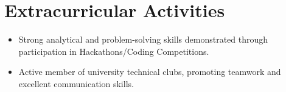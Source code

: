\documentclass[letterpaper,11pt]{article}
\newcommand{\resumeItem}[1]{
  \item\small{
    {#1 \vspace{-2pt}}
  }
}
\newcommand{\resumeSubItem}[1]{\resumeItem{#1}\vspace{-4pt}}
\newcommand{\resumeSubHeadingListStart}{\begin{itemize}[leftmargin=0.15in, label={}]}
\newcommand{\resumeSubHeadingListEnd}{\end{itemize}}
\begin{document}
\section{Extracurricular Activities}
  \resumeSubHeadingListStart
    \resumeSubItem{Strong analytical and problem-solving skills demonstrated through participation in Hackathons/Coding Competitions.}
    \resumeSubItem{Active member of university technical clubs, promoting teamwork and excellent communication skills.}
  \resumeSubHeadingListEnd
\end{document}

